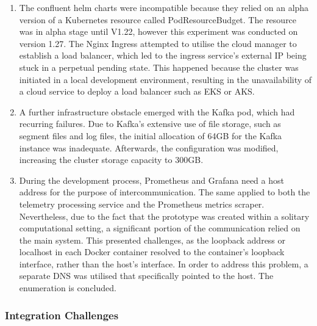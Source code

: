 \documentclass[journal]{IEEEtran}
\begin{document}
\begin{enumerate} 
  \item The confluent helm charts were incompatible because they relied on an alpha version of a Kubernetes resource called PodResourceBudget. The resource was in alpha stage until V1.22, however this experiment was conducted on version 1.27. The Nginx Ingress attempted to utilise the cloud manager to establish a load balancer, which led to the ingress service's external IP being stuck in a perpetual pending state. This happened because the cluster was initiated in a local development environment, resulting in the unavailability of a cloud service to deploy a load balancer such as EKS or AKS.
    \item A further infrastructure obstacle emerged with the Kafka pod, which had recurring failures. Due to Kafka's extensive use of file storage, such as segment files and log files, the initial allocation of 64GB for the Kafka instance was inadequate. Afterwards, the configuration was modified, increasing the cluster storage capacity to 300GB.
    \item During the development process, Prometheus and Grafana need a host address for the purpose of intercommunication. The same applied to both the telemetry processing service and the Prometheus metrics scraper. Nevertheless, due to the fact that the prototype was created within a solitary computational setting, a significant portion of the communication relied on the main system. This presented challenges, as the loopback address or localhost in each Docker container resolved to the container's loopback interface, rather than the host's interface. In order to address this problem, a separate DNS was utilised that specifically pointed to the host.
The enumeration is concluded.
\end{enumerate} 

\subsubsection{Integration Challenges} 
\end{document}
